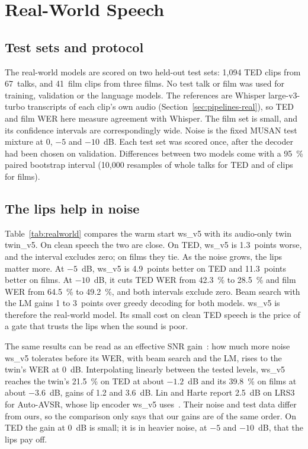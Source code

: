 \section{Real-World Speech}
\label{sec:realworld}

\subsection{Test sets and protocol}
The real-world models are scored on two held-out test sets: 1,094 TED clips from 67~talks, and
41~film clips from three films. No test talk or film was used for training, validation or the
language models. The references are Whisper large-v3-turbo transcripts of each clip's own audio
(Section~\ref{sec:pipelines-real}), so TED and film WER here measure agreement with Whisper. The
film set is small, and its confidence intervals are correspondingly wide. Noise is the fixed
MUSAN test mixture at 0, $-5$ and $-10$~dB. Each test set was scored once, after the decoder had
been chosen on validation. Differences between two models come with a 95~\% paired bootstrap
interval (10,000 resamples of whole talks for TED and of clips for films).

\subsection{The lips help in noise}
Table~\ref{tab:realworld} compares the warm start ws\_v5 with its audio-only twin twin\_v5. On
clean speech the two are close. On TED, ws\_v5 is 1.3~points worse, and the interval excludes
zero; on films they tie. As the noise grows, the lips matter more. At $-5$~dB, ws\_v5 is
4.9~points better on TED and 11.3~points better on films. At $-10$~dB, it cuts TED WER from
42.3~\% to 28.5~\% and film WER from 64.5~\% to 49.2~\%, and both intervals exclude zero.
Beam search with the LM gains 1 to 3~points over greedy decoding for both models. ws\_v5 is
therefore the real-world model. Its small cost on clean TED speech is the price of a gate that
trusts the lips when the sound is poor.

The same results can be read as an effective SNR gain~\cite{lin2025}: how much more noise ws\_v5
tolerates before its WER, with beam search and the LM, rises to the twin's WER at 0~dB.
Interpolating linearly between the tested levels, ws\_v5 reaches the twin's 21.5~\% on TED at about
$-1.2$~dB and its 39.8~\% on films at about $-3.6$~dB, gains of 1.2 and 3.6~dB. Lin and Harte
report 2.5~dB on LRS3 for Auto-AVSR, whose lip encoder ws\_v5 uses~\cite{lin2025}. Their noise and
test data differ from ours, so the comparison only says that our gains are of the same order. On
TED the gain at 0~dB is small; it is in heavier noise, at $-5$ and $-10$~dB, that the lips pay off.


